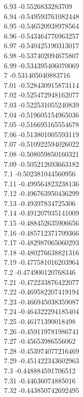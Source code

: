 {6.93	-0.5526833283709\\
6.94	-0.549593761082448\\
6.95	-0.546520938978564\\
6.96	-0.543464776963257\\
6.97	-0.540425190313017\\
6.98	-0.537402094675807\\
6.99	-0.534395406070069\\
7	-0.531405040883716\\
7.01	-0.528430915873114\\
7.02	-0.525472948162077\\
7.03	-0.522531055240839\\
7.04	-0.519605154965036\\
7.05	-0.516695165554678\\
7.06	-0.513801005593119\\
7.07	-0.510922594026022\\
7.08	-0.508059850160321\\
7.09	-0.505212693663182\\
7.1	-0.502381044560956\\
7.11	-0.499564823238136\\
7.12	-0.496763950436299\\
7.13	-0.49397834725306\\
7.14	-0.491207935141009\\
7.15	-0.488452635906656\\
7.16	-0.485712371709366\\
7.17	-0.482987065060293\\
7.18	-0.480276638821316\\
7.19	-0.477581016203964\\
7.2	-0.474900120768346\\
7.21	-0.472233876422077\\
7.22	-0.469582207419194\\
7.23	-0.466945038359087\\
7.24	-0.464322294185404\\
7.25	-0.46171390018498\\
7.26	-0.459119781986741\\
7.27	-0.45653986556062\\
7.28	-0.453974077216469\\
7.29	-0.451422343602963\\
7.3	-0.448884591706512\\
7.31	-0.44636074885016\\
7.32	-0.443850742692495\\
}
